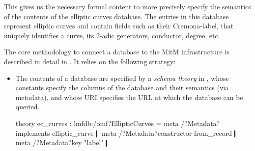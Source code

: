 This gives us the necessary formal content to more precisely specify the semantics of the contents of the \LMFDB elliptic curves database. The entries in this database represent elliptic curves and contain fields such as their Cremona-label, that uniquely identifies a curve, its $2$-adic generators, conductor, degree, etc.

The core methodology to connect a database to the MitM infrastructure is described in detail in \cite{WieKohRab:vtuimkb17}. It relies on the following strategy:
\begin{itemize}
	\item The contents of a database are specified by a \emph{schema theory} in \mmt, whose constants specify the columns of the database and their semantics (via metadata), and whose URI specifies the URL at which the database can be queried.
	\begin{mmtcode}[caption= {The Schema Theory for Elliptic Curves\protect\footnotemark},label=lst:import:lmfdb:schema]
theory ec_curves : lmfdb:/omf?EllipticCurves =
  meta /?Metadata?implements elliptic_curve❙
  meta /?Metadata?constructor from_record❙
  meta /?Metadata?key "label"❙


\end{mmtcode}
\end{itemize}

